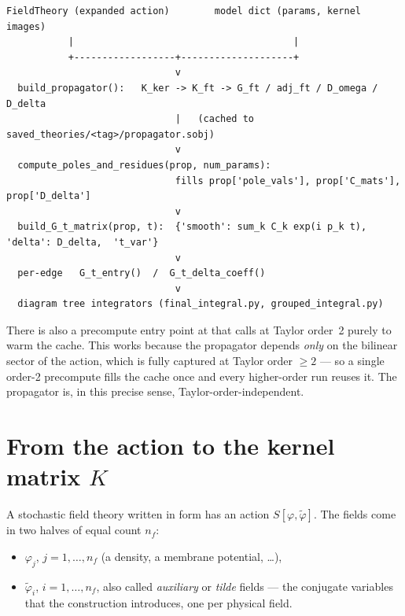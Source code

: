 \begin{lstlisting}[style=console]
  FieldTheory (expanded action)        model dict (params, kernel images)
           |                                       |
           +------------------+--------------------+
                              v
  build_propagator():   K_ker -> K_ft -> G_ft / adj_ft / D_omega / D_delta
                              |   (cached to saved_theories/<tag>/propagator.sobj)
                              v
  compute_poles_and_residues(prop, num_params):
                              fills prop['pole_vals'], prop['C_mats'], prop['D_delta']
                              v
  build_G_t_matrix(prop, t):  {'smooth': sum_k C_k exp(i p_k t),  'delta': D_delta,  't_var'}
                              v
  per-edge   G_t_entry()  /  G_t_delta_coeff()
                              v
  diagram tree integrators (final_integral.py, grouped_integral.py)
\end{lstlisting}

\begin{note}
There is also a precompute entry point at 
that calls  at Taylor order~2 purely to warm the cache.
This works because the propagator depends \emph{only} on the bilinear sector of
the action, which is fully captured at Taylor order $\ge 2$ --- so a single
order-2 precompute fills the cache once and every higher-order run reuses it.
The propagator is, in this precise sense, Taylor-order-independent.
\end{note}

\section{From the action to the kernel matrix \texorpdfstring{$K$}{K}}

A stochastic field theory written in \msrjd{} form has an action $S[\varphi,
\tilde\varphi]$. The fields come in two halves of equal count $n_f$:

\begin{itemize}
  \item {} $\varphi_j$, $j = 1,\dots,n_f$ (a density, a
        membrane potential, \ldots),
  \item {} $\tilde\varphi_i$, $i = 1,\dots,n_f$, also called
        \emph{auxiliary} or \emph{tilde} fields --- the conjugate variables that
        the \msrjd{} construction introduces, one per physical field.
\end{itemize}


